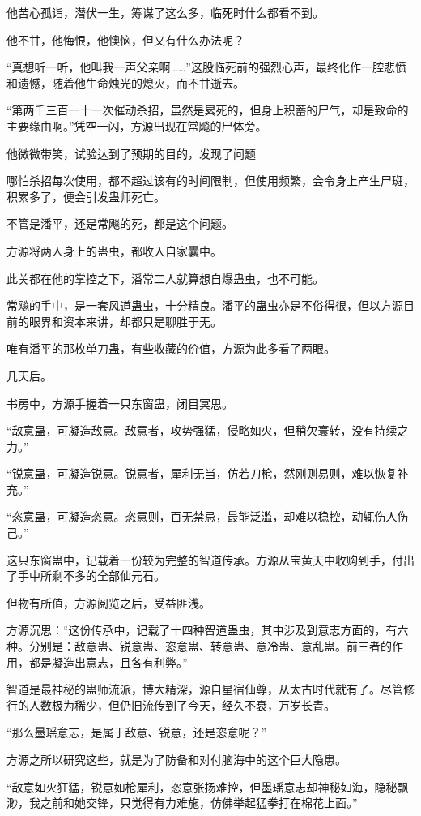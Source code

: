 \begin{this_body}
他苦心孤诣，潜伏一生，筹谋了这么多，临死时什么都看不到。

他不甘，他悔恨，他懊恼，但又有什么办法呢？

“真想听一听，他叫我一声父亲啊……”这股临死前的强烈心声，最终化作一腔悲愤和遗憾，随着他生命烛光的熄灭，而不甘逝去。

“第两千三百一十一次催动杀招，虽然是累死的，但身上积蓄的尸气，却是致命的主要缘由啊。”凭空一闪，方源出现在常飚的尸体旁。

他微微带笑，试验达到了预期的目的，发现了问题

哪怕杀招每次使用，都不超过该有的时间限制，但使用频繁，会令身上产生尸斑，积累多了，便会引发蛊师死亡。

不管是潘平，还是常飚的死，都是这个问题。

方源将两人身上的蛊虫，都收入自家囊中。

此关都在他的掌控之下，潘常二人就算想自爆蛊虫，也不可能。

常飚的手中，是一套风道蛊虫，十分精良。潘平的蛊虫亦是不俗得很，但以方源目前的眼界和资本来讲，却都只是聊胜于无。

唯有潘平的那枚单刀蛊，有些收藏的价值，方源为此多看了两眼。

几天后。

书房中，方源手握着一只东窗蛊，闭目冥思。

“敌意蛊，可凝造敌意。敌意者，攻势强猛，侵略如火，但稍欠寰转，没有持续之力。”

“锐意蛊，可凝造锐意。锐意者，犀利无当，仿若刀枪，然刚则易则，难以恢复补充。”

“恣意蛊，可凝造恣意。恣意则，百无禁忌，最能泛滥，却难以稳控，动辄伤人伤己。”

这只东窗蛊中，记载着一份较为完整的智道传承。方源从宝黄天中收购到手，付出了手中所剩不多的全部仙元石。

但物有所值，方源阅览之后，受益匪浅。

方源沉思：“这份传承中，记载了十四种智道蛊虫，其中涉及到意志方面的，有六种。分别是：敌意蛊、锐意蛊、恣意蛊、转意蛊、意冷蛊、意乱蛊。前三者的作用，都是凝造出意志，且各有利弊。”

智道是最神秘的蛊师流派，博大精深，源自星宿仙尊，从太古时代就有了。尽管修行的人数极为稀少，但仍旧流传到了今天，经久不衰，万岁长青。

“那么墨瑶意志，是属于敌意、锐意，还是恣意呢？”

方源之所以研究这些，就是为了防备和对付脑海中的这个巨大隐患。

“敌意如火狂猛，锐意如枪犀利，恣意张扬难控，但墨瑶意志却神秘如海，隐秘飘渺，我之前和她交锋，只觉得有力难施，仿佛举起猛拳打在棉花上面。”


\end{this_body}
